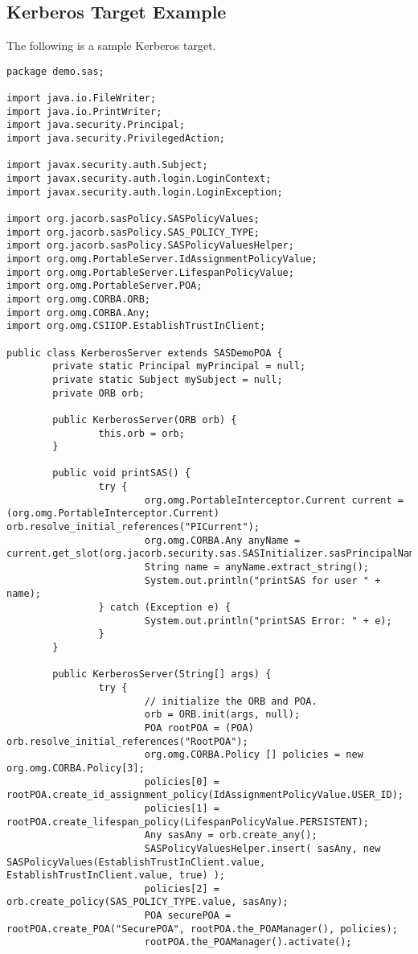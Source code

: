 \subsection{Kerberos Target Example}

The following is a sample Kerberos target.

\begin{scriptsize}
\begin{verbatim}
package demo.sas;

import java.io.FileWriter;
import java.io.PrintWriter;
import java.security.Principal;
import java.security.PrivilegedAction;

import javax.security.auth.Subject;
import javax.security.auth.login.LoginContext;
import javax.security.auth.login.LoginException;

import org.jacorb.sasPolicy.SASPolicyValues;
import org.jacorb.sasPolicy.SAS_POLICY_TYPE;
import org.jacorb.sasPolicy.SASPolicyValuesHelper;
import org.omg.PortableServer.IdAssignmentPolicyValue;
import org.omg.PortableServer.LifespanPolicyValue;
import org.omg.PortableServer.POA;
import org.omg.CORBA.ORB;
import org.omg.CORBA.Any;
import org.omg.CSIIOP.EstablishTrustInClient;

public class KerberosServer extends SASDemoPOA {
        private static Principal myPrincipal = null; 
        private static Subject mySubject = null;        
        private ORB orb;

        public KerberosServer(ORB orb) {
                this.orb = orb;
        }

        public void printSAS() {
                try {
                        org.omg.PortableInterceptor.Current current = (org.omg.PortableInterceptor.Current) orb.resolve_initial_references("PICurrent");
                        org.omg.CORBA.Any anyName = current.get_slot(org.jacorb.security.sas.SASInitializer.sasPrincipalNamePIC);
                        String name = anyName.extract_string();
                        System.out.println("printSAS for user " + name);
                } catch (Exception e) {
                        System.out.println("printSAS Error: " + e);
                }
        }
        
        public KerberosServer(String[] args) {
                try {
                        // initialize the ORB and POA.
                        orb = ORB.init(args, null);
                        POA rootPOA = (POA) orb.resolve_initial_references("RootPOA");
                        org.omg.CORBA.Policy [] policies = new org.omg.CORBA.Policy[3];
                        policies[0] = rootPOA.create_id_assignment_policy(IdAssignmentPolicyValue.USER_ID);
                        policies[1] = rootPOA.create_lifespan_policy(LifespanPolicyValue.PERSISTENT);
                        Any sasAny = orb.create_any();
                        SASPolicyValuesHelper.insert( sasAny, new SASPolicyValues(EstablishTrustInClient.value, EstablishTrustInClient.value, true) );
                        policies[2] = orb.create_policy(SAS_POLICY_TYPE.value, sasAny);
                        POA securePOA = rootPOA.create_POA("SecurePOA", rootPOA.the_POAManager(), policies);
                        rootPOA.the_POAManager().activate();
                        

\end{verbatim}
\end{scriptsize}
